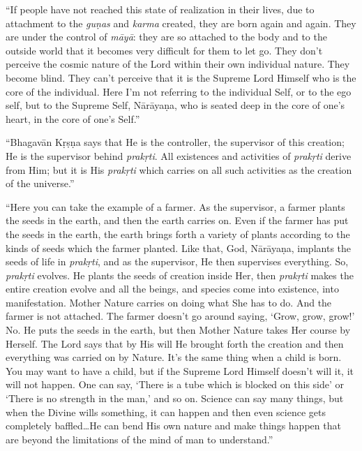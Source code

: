\enquote{If people have not reached this state of realization in their lives, due to attachment to the \textit{guṇas} and \textit{karma} created, they are born again and again. They are under the control of \textit{māyā}: they are so attached to the body and to the outside world that it becomes very difficult for them to let go. They don’t perceive the cosmic nature of the Lord within their own individual nature. They become blind. They can’t perceive that it is the Supreme Lord Himself who is the core of the individual. Here I’m not referring to the individual Self, or to the ego self, but to the Supreme Self, Nārāyaṇa, who is seated deep in the core of one’s heart, in the core of one’s Self.}

\enquote{Bhagavān Kṛṣṇa says that He is the controller, the supervisor of this creation; He is the supervisor behind \textit{prakṛti}. All existences and activities of \textit{prakṛti} derive from Him; but it is His \textit{prakṛti} which carries on all such activities as the creation of the universe.}

\enquote{Here you can take the example of a farmer. As the supervisor, a farmer plants the seeds in the earth, and then the earth carries on. Even if the farmer has put the seeds in the earth, the earth brings forth a variety of plants according to the kinds of seeds which the farmer planted. Like that, God, Nārāyaṇa, implants the seeds of life in \textit{prakṛti}, and as the supervisor, He then supervises everything. So, \textit{prakṛti} evolves. He plants the seeds of creation inside Her, then \textit{prakṛti} makes the entire creation evolve and all the beings, and species come into existence, into manifestation. Mother Nature carries on doing what She has to do. And the farmer is not attached. The farmer doesn’t go around saying, \enquote{Grow, grow, grow!} No. He puts the seeds in the earth, but then Mother Nature takes Her course by Herself. The Lord says that by His will He brought forth the creation and then everything was carried on by Nature. It’s the same thing when a child is born. You may want to have a child, but if the Supreme Lord Himself doesn’t will it, it will not happen. One can say, \enquote{There is a tube which is blocked on this side} or \enquote{There is no strength in the man,} and so on. Science can say many things, but when the Divine wills something, it can happen and then even science gets completely baffled\ldots He can bend His own nature and make things happen that are beyond the limitations of the mind of man to understand.}

